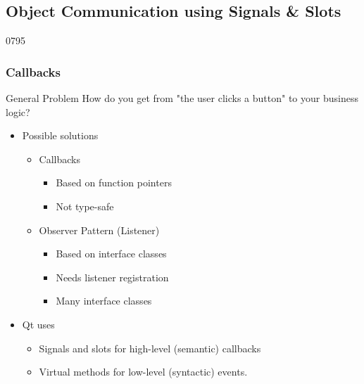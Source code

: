 %
%
%
%

\subsection{Object Communication using Signals \& Slots}

\begin{slide}[fragile]{0795}\frametitle{Callbacks}
  \begin{block}{General Problem}
    How do you get from "the user clicks a button" to your business logic?
  \end{block}
  \begin{itemize}
 \item Possible solutions
    \begin{itemize}
    \item Callbacks
      \begin{itemize}
      \item Based on function pointers
      \item Not type-safe
     \end{itemize}
    \item Observer Pattern (Listener)
      \begin{itemize}
      \item Based on interface classes
      \item Needs listener registration
      \item Many interface classes
      \end{itemize}  
    \end{itemize}
  \item Qt uses
    \begin{itemize}
    \item Signals and slots for high-level (semantic) callbacks
    \item Virtual methods for low-level (syntactic) events.
    \end{itemize}
  \end{itemize}
\end{slide}

